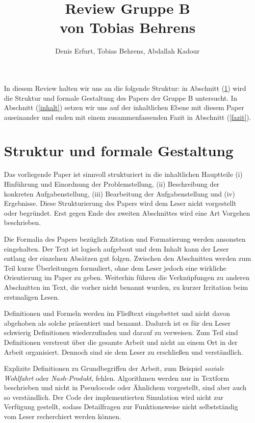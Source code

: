\documentclass[sigconf]{acmart}
\begin{document}
\title{Review Gruppe B \\ von Tobias Behrens}
\author{Denis Erfurt, Tobias Behrens, Abdallah Kadour}

\maketitle

In diesem Review halten wir uns an die folgende Struktur: in Abschnitt (\ref{struktur}) wird die Struktur und formale Gestaltung des Papers der Gruppe B untersucht. In Abschnitt (\ref{inhalt}) setzen wir uns auf der inhaltlichen Ebene mit diesem Paper auseinander und enden mit einem zusammenfassenden Fazit in Abschnitt (\ref{fazit}).

\section{Struktur und formale Gestaltung}
\label{struktur}
Das vorliegende Paper ist sinnvoll strukturiert in die inhaltlichen Hauptteile (i) Hinführung und Einordnung der Problemstellung, (ii) Beschreibung der konkreten Aufgabenstellung, (iii) Bearbeitung der Aufgabenstellung und (iv) Ergebnisse. Diese Strukturierung des Papers wird dem Leser nicht vorgestellt oder begründet. Erst gegen Ende des zweiten Abschnittes wird eine Art Vorgehen beschrieben.

Die Formalia des Papers bezüglich Zitation und Formatierung werden ansonsten eingehalten. Der Text ist logisch aufgebaut und dem Inhalt kann der Leser entlang der einzelnen Absätzen gut folgen. Zwischen den Abschnitten werden zum Teil kurze Überleitungen formuliert, ohne dem Leser jedoch eine wirkliche Orientierung im Paper zu geben. Weiterhin führen die Verknüpfungen zu anderen Abschnitten im Text, die vorher nicht benannt wurden, zu kurzer Irritation beim erstmaligen Lesen.

Definitionen und Formeln werden im Fließtext eingebettet und nicht davon abgehoben als solche präsentiert und benannt. Dadurch ist es für den Leser schwierig Definitionen wiederzufinden und darauf zu verweisen. Zum Teil sind Definitionen verstreut über die gesamte Arbeit und nicht an einem Ort in der Arbeit organisiert. Dennoch sind sie dem Leser zu erschließen und verständlich.

Explizite Definitionen zu Grundbegriffen der Arbeit, zum Beispiel \textit{soziale Wohlfahrt} oder \textit{Nash-Produkt}, fehlen. Algorithmen werden nur in Textform beschrieben und nicht in Pseudocode oder Ähnlichem vorgestellt, sind aber auch so verständlich. Der Code der implementierten Simulation wird nicht zur Verfügung gestellt, sodass Detailfragen zur Funktionsweise nicht selbstständig vom Leser recherchiert werden können.
\end{document}
